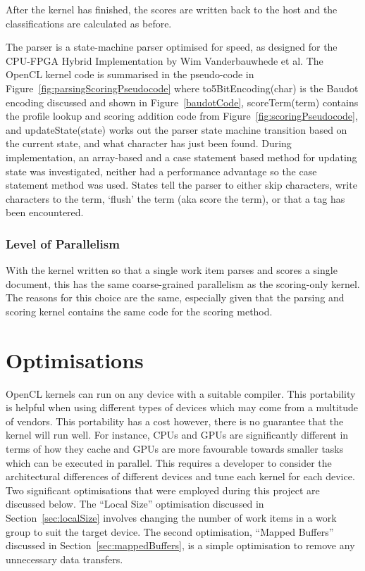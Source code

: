 After the kernel has finished, the scores are written back to the host and the
classifications are calculated as before.

The parser is a state-machine parser optimised for speed, as designed for the
CPU-FPGA Hybrid Implementation \cite{HybridCPUFPGA} by Wim Vanderbauwhede et al.
The OpenCL kernel code is summarised in the pseudo-code in
Figure~\ref{fig:parsingScoringPseudocode} where to5BitEncoding(char) is the
Baudot encoding discussed and shown in Figure~\ref{baudotCode}, scoreTerm(term)
contains the profile lookup and scoring addition code from
Figure~\ref{fig:scoringPseudocode}, and updateState(state) works out the parser
state machine transition based on the current state, and what character has just
been found. During implementation, an array-based and a case statement based
method for updating state was investigated, neither had a performance advantage
so the case statement method was used. States tell the parser to either skip
characters, write characters to the term, `flush' the term (aka score the term),
or that a tag has been encountered.

\subsubsection{Level of Parallelism}

With the kernel written so that a single work item parses and scores a single
document, this has the same coarse-grained parallelism as the scoring-only
kernel. The reasons for this choice are the same, especially given that the
parsing and scoring kernel contains the same code for the scoring method.

\section{Optimisations}

OpenCL kernels can run on any device with a suitable compiler. This portability
is helpful when using different types of devices which may come from a multitude
of vendors. This portability has a cost however, there is no guarantee that the
kernel will run well. For instance, CPUs and GPUs are significantly different in
terms of how they cache and GPUs are more favourable towards smaller tasks which
can be executed in parallel. This requires a developer to consider the
architectural differences of different devices and tune each kernel for each
device. Two significant optimisations that were employed during this project are
discussed below. The ``Local Size'' optimisation discussed in
Section~\ref{sec:localSize} involves changing the number of work items in a work
group to suit the target device. The second optimisation, ``Mapped Buffers''
discussed in Section~\ref{sec:mappedBuffers}, is a simple optimisation to remove
any unnecessary data transfers.

